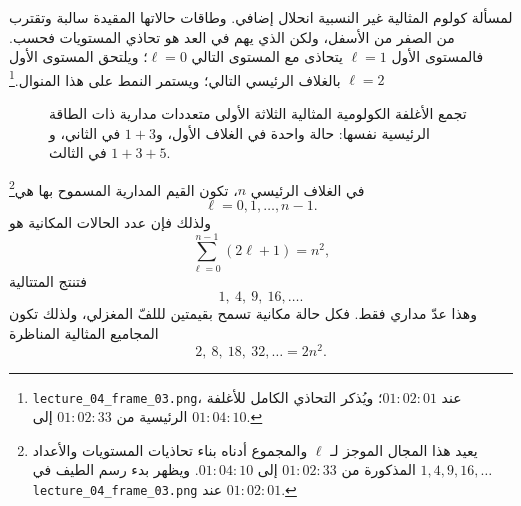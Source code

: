 لمسألة كولوم المثالية غير النسبية انحلال إضافي. وطاقات حالاتها المقيدة سالبة وتقترب من الصفر من الأسفل، ولكن الذي يهم في العد هو تحاذي المستويات فحسب. فالمستوى الأول \(\ell=1\) يتحاذى مع المستوى التالي \(\ell=0\)؛ ويلتحق المستوى الأول \(\ell=2\) بالغلاف الرئيسي التالي؛ ويستمر النمط على هذا المنوال.\footnote{\texttt{lecture\_04\_frame\_03.png}، عند \(01{:}02{:}01\)؛ ويُذكر التحاذي الكامل للأغلفة الرئيسية من \(01{:}02{:}33\) إلى \(01{:}04{:}10\).}

\begin{figure}[htbp]
\centering
{}
\caption{تجمع الأغلفة الكولومية المثالية الثلاثة الأولى متعددات مدارية ذات الطاقة الرئيسية نفسها: حالة واحدة في الغلاف الأول، و\(1+3\) في الثاني، و\(1+3+5\) في الثالث.}
\end{figure}

في الغلاف الرئيسي \(n\)، تكون القيم المدارية المسموح بها هي\footnote{يعيد هذا المجال الموجز لـ \(\ell\) والمجموع أدناه بناء تحاذيات المستويات والأعداد \(1,4,9,16,\ldots\) المذكورة من \(01{:}02{:}33\) إلى \(01{:}04{:}10\). ويظهر بدء رسم الطيف في \texttt{lecture\_04\_frame\_03.png} عند \(01{:}02{:}01\).}
\[
\ell=0,1,\ldots,n-1.
\]
ولذلك فإن عدد الحالات المكانية هو
\begin{equation}
\sum_{\ell=0}^{n-1}(2\ell+1)=n^{2},
\end{equation}
فتنتج المتتالية
\begin{equation}
1,\ 4,\ 9,\ 16,\ldots .
\end{equation}
وهذا عدّ مداري فقط. فكل حالة مكانية تسمح بقيمتين لللفّ المغزلي، ولذلك تكون المجاميع المثالية المناظرة
\begin{equation}
2,\ 8,\ 18,\ 32,\ldots=2n^{2}.
\end{equation}

